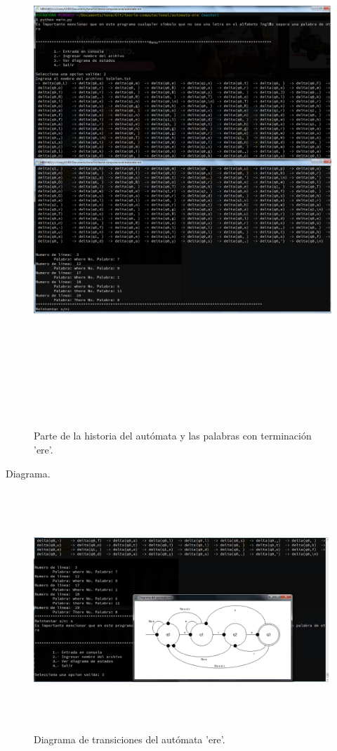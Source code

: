 	\begin{figure}[H]
		\begin{center}
			\includegraphics[width=\linewidth, height=20cm]{img/ere-automatico.png}
			\caption{Parte de la historia del autómata y las palabras con terminación 'ere'.}
			\label{fig:ere2}
		\end{center}
	\end{figure}
	{\large Diagrama.}
	\begin{figure}[H]
		\begin{center}
			\includegraphics[width=\linewidth, height=9cm]{img/diagrama-ere.png}
			\caption{Diagrama de transiciones del autómata 'ere'.}
			\label{fig:ere3}
		\end{center}
	\end{figure}